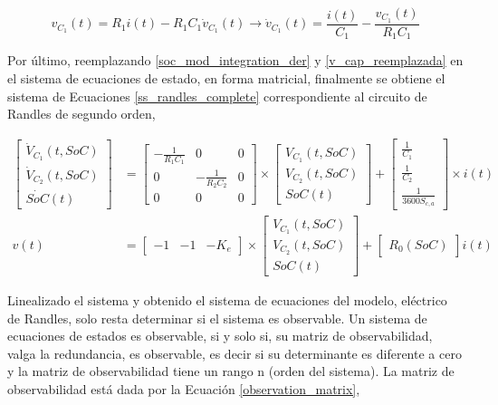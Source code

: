\documentclass[10pt,a4paper]{article}
\newcounter{subsubsubsection}[subsubsection]
\begin{document}
\begin{equation}
    v_{C_1}(t) = R_1i(t) - R_1C_1\dot{v}_{C_1}(t) \rightarrow 
    \dot{v}_{C_1}(t) = \frac{i(t)}{C_1} -
    \frac{v_{C_1}(t)}{R_1C_1}\label{v_cap_reemplazada}
\end{equation}

Por \'ultimo, reemplazando \ref{soc_mod_integration_der} y
\ref{v_cap_reemplazada} en el sistema de ecuaciones de estado, en forma
matricial, finalmente se obtiene el sistema de Ecuaciones 
\ref{ss_randles_complete} correspondiente al circuito de Randles de segundo
orden,

\begin{align}
    \begin{bmatrix}
        \dot{V}_{C_1}(t, SoC) \\ \dot{V}_{C_2}(t, SoC) \\ \dot{SoC}(t)
    \end{bmatrix} &= 
    \begin{bmatrix}
        -\frac{1}{R_1C_1} & 0 & 0\\
        0 & -\frac{1}{R_2C_2} & 0\\
        0 & 0 & 0
    \end{bmatrix}
    \times\begin{bmatrix}V_{C_1}(t, SoC) \\ V_{C_2}(t, SoC) \\ SoC(t)\end{bmatrix}
    +
    \begin{bmatrix}
        \frac{1}{C_1} \\ \frac{1}{C_2} \\ \frac{1}{3600S_{c,a}}
    \end{bmatrix}
    \times i(t)\nonumber \\
    v(t) &= \begin{bmatrix} -1 & -1 & -K_e \end{bmatrix} \times 
    \begin{bmatrix} V_{C_1}(t, SoC) \\ V_{C_2}(t, SoC) \\ SoC(t) \end{bmatrix} +
    \begin{bmatrix} R_0(SoC) \end{bmatrix} i(t)\label{ss_randles_complete}
\end{align}

\newpage


Linealizado el sistema y obtenido el sistema de ecuaciones del modelo,
el\'ectrico de Randles, solo resta determinar si el sistema es observable. Un
sistema de ecuaciones de estados es observable, si y solo si, su matriz de
observabilidad, valga la redundancia, es observable, es decir si su determinante 
es diferente a cero y la matriz de observabilidad tiene un rango n 
(orden del sistema). La matriz de observabilidad est\'a dada por la Ecuaci\'on 
\ref{observation_matrix},
\end{document}
